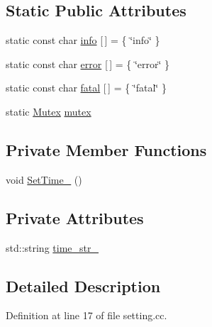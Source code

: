 \subsection*{Static Public Attributes}
\begin{DoxyCompactItemize}
\item 
static const char \hyperlink{classmocha_1_1_setting_1_1_ptr_impl_ac552226d2066caf42767a46cd55374e1}{info} \mbox{[}$\,$\mbox{]} = \{ \char`\"{}info\char`\"{} \}
\item 
static const char \hyperlink{classmocha_1_1_setting_1_1_ptr_impl_a8d10834172c72d9864d7504b61849663}{error} \mbox{[}$\,$\mbox{]} = \{ \char`\"{}error\char`\"{} \}
\item 
static const char \hyperlink{classmocha_1_1_setting_1_1_ptr_impl_aea6af2d60173b965ab3b3b05b35f8e76}{fatal} \mbox{[}$\,$\mbox{]} = \{ \char`\"{}fatal\char`\"{} \}
\item 
static \hyperlink{classmocha_1_1_mutex}{Mutex} \hyperlink{classmocha_1_1_setting_1_1_ptr_impl_a1ebc25302cae41a711f6197aa09a79f9}{mutex}
\end{DoxyCompactItemize}
\subsection*{Private Member Functions}
\begin{DoxyCompactItemize}
\item 
void \hyperlink{classmocha_1_1_setting_1_1_ptr_impl_a8adb95c3598b38cd0451010b7ed30e50}{SetTime\_\-} ()
\end{DoxyCompactItemize}
\subsection*{Private Attributes}
\begin{DoxyCompactItemize}
\item 
std::string \hyperlink{classmocha_1_1_setting_1_1_ptr_impl_a23c40fb9cc32d08108bff2d45f9d051c}{time\_\-str\_\-}
\end{DoxyCompactItemize}


\subsection{Detailed Description}


Definition at line 17 of file setting.cc.




